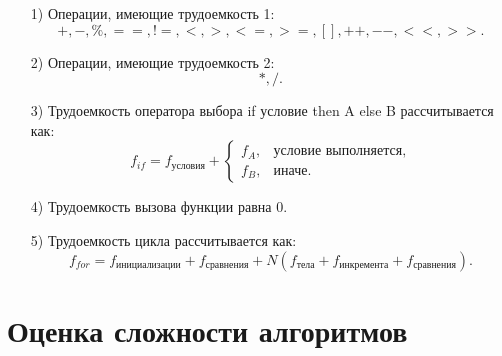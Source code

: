 \documentclass[a4paper,14pt, unknownkeysallowed]{extreport}
\begin{document}
\begin{enumerate}
	\item[1)] Операции, имеющие трудоемкость 1:
	\begin{equation*}
	   +, -, \%, ==, !=, <, >, <=, >=, [], ++, {-}-, {<}<, {>}>.
	\end{equation*}
	\item[2)] Операции, имеющие трудоемкость 2:
	\begin{equation*}
		*, /.
	\end{equation*}
	\item[3)] Трудоемкость оператора выбора if условие then A else B рассчитывается как:
	\begin{equation*}
		f_{if} = f_{\text{условия}} +
	\begin{cases}
		f_A, & \text{условие выполняется,}\\
		f_B, & \text{иначе.}
	\end{cases}
	\end{equation*}
	\item[4)] Трудоемкость вызова функции равна 0.
	\item[5)] Трудоемкость цикла рассчитывается как:
	\begin{equation*}
		f_{for} = f_{\text{инициализации}} + f_{\text{сравнения}} + N(f_{\text{тела}} + f_{\text{инкремента}} + f_{\text{сравнения}}).
	\end{equation*}
\end{enumerate}

\section{Оценка сложности алгоритмов}
\end{document}
